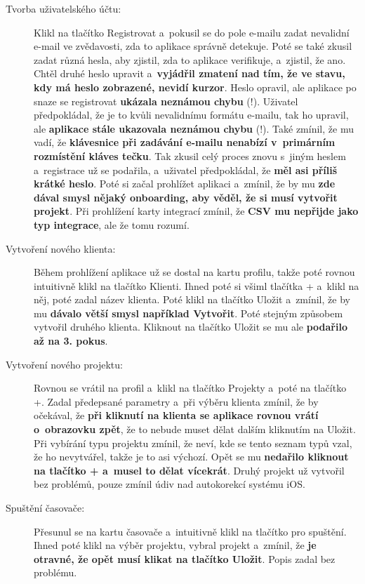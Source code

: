 \begin{description}
\item[Tvorba uživatelského účtu:] Klikl na tlačítko Registrovat a~pokusil se do pole e-mailu zadat nevalidní e-mail ve zvědavosti, zda to aplikace správně detekuje. Poté se také zkusil zadat různá hesla, aby zjistil, zda to aplikace verifikuje, a~zjistil, že ano. Chtěl druhé heslo upravit a~\textbf{vyjádřil zmatení nad tím, že ve stavu, kdy má heslo zobrazené, nevidí kurzor}. Heslo opravil, ale aplikace po snaze se registrovat \textbf{ukázala neznámou chybu} (!). Uživatel předpokládal, že je to kvůli nevalidnímu formátu e-mailu, tak ho upravil, ale \textbf{aplikace stále ukazovala neznámou chybu} (!). Také zmínil, že mu vadí, že \textbf{klávesnice při zadávání e-mailu nenabízí v~primárním rozmístění kláves tečku}. Tak zkusil celý proces znovu s~jiným heslem a~registrace už se podařila, a~uživatel předpokládal, že \textbf{měl asi příliš krátké heslo}. Poté si začal prohlížet aplikaci a~zmínil, že by mu \textbf{zde dával smysl nějaký onboarding, aby věděl, že si musí vytvořit projekt}. Při prohlížení karty integrací zmínil, že \textbf{CSV mu nepřijde jako typ integrace}, ale že tomu rozumí.
\item[Vytvoření nového klienta:] Během prohlížení aplikace už se dostal na kartu profilu, takže poté rovnou intuitivně klikl na tlačítko Klienti. Ihned poté si všiml tlačítka + a~klikl na něj, poté zadal název klienta. Poté klikl na tlačítko Uložit a~zmínil, že by mu \textbf{dávalo větší smysl například Vytvořit}. Poté stejným způsobem vytvořil druhého klienta. Kliknout na tlačítko Uložit se mu ale \textbf{podařilo až na 3. pokus}.
\item[Vytvoření nového projektu:] Rovnou se vrátil na profil a~klikl na tlačítko Projekty a~poté na tlačítko +. Zadal předepsané parametry a~při výběru klienta zmínil, že by očekával, že \textbf{při kliknutí na klienta se aplikace rovnou vrátí o~obrazovku zpět}, že to nebude muset dělat dalším kliknutím na Uložit. Při vybírání typu projektu zmínil, že neví, kde se tento seznam typů vzal, že ho nevytvářel, takže je to asi výchozí. Opět se mu \textbf{nedařilo kliknout na tlačítko + a~musel to dělat vícekrát}. Druhý projekt už vytvořil bez problémů, pouze zmínil údiv nad autokorekcí systému iOS.
\item[Spuštění časovače:] Přesunul se na kartu časovače a~intuitivně klikl na tlačítko pro spuštění. Ihned poté klikl na výběr projektu, vybral projekt a~zmínil, že \textbf{je otravné, že opět musí klikat na tlačítko Uložit}. Popis zadal bez problému.

\end{description}
